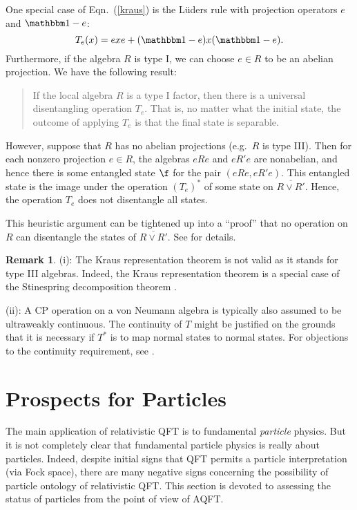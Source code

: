 \documentclass[11pt]{article}
\theoremstyle{definition}
\theoremstyle{definition}
\newtheorem{note}[thm]{Remark}
\theoremstyle{remark}
\def\8#1{{\mathbbm #1}}
\begin{document}
\noindent One special case of Eqn.\ (\ref{kraus}) is the L{\"u}ders
rule with projection operators $e$ and $\81 -e$:
$$ T_e(x)=exe+(\81 -e)x(\81 -e) .$$
Furthermore, if the algebra $R$ is type I, we can
choose $e\in R$ to be an abelian projection.  We have
the following result:
\begin{quote} If the local algebra $R$ is a type I factor, then there
  is a universal disentangling operation $T_e$.  That is, no matter
  what the initial state, the outcome of applying $T_e$ is that the
  final state is separable.
\end{quote} However, suppose that $R$ has no abelian projections
(e.g.\ $R$ is type III).  Then for each nonzero projection $e\in R$,
the algebras $eRe$ and $eR'e$ are nonabelian, and hence there is some
entangled state $\f$ for the pair $(eRe,eR'e)$.  This entangled state
is the image under the operation $(T_e)^*$ of some state on
$\overline{R\vee R'}$.  Hence, the operation $T_e$ does not
disentangle all states.

This heuristic argument can be tightened up into a ``proof'' that no
operation on $R$ can disentangle the states of $\overline{R\vee R'}$.
See \cite{clif} for details.

\begin{note} (i): The Kraus representation theorem is not valid as it
  stands for type III algebras.  Indeed, the Kraus representation
  theorem is a special case of the Stinespring decomposition theorem
  \cite{sti}.

  (ii): A CP operation on a von Neumann algebra is typically also
  assumed to be ultraweakly continuous.  The continuity of $T$ might
  be justified on the grounds that it is necessary if $T^*$ is to map
  normal states to normal states.  For objections to the continuity
  requirement, see \cite{sri}.
\end{note}





\section{Prospects for Particles} \label{parts}

The main application of relativistic QFT is to fundamental
\emph{particle} physics.  But it is not completely clear that
fundamental particle physics is really about particles.  Indeed,
despite initial signs that QFT permits a particle interpretation (via
Fock space), there are many negative signs concerning the possibility
of particle ontology of relativistic QFT.  This section is devoted to
assessing the status of particles from the point of view of AQFT.
\end{document}
